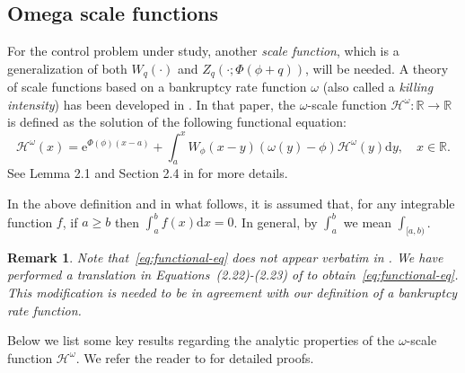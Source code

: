 \documentclass[11pt,reqno]{amsart}
\newcommand{\green}{\textcolor[rgb]{0.00,0.50,0.50}}
\newtheorem{remark}{Remark}[section]
\newcommand{\reals}{\mathbb{R}}
\newcommand{\diff}{\mathrm{d}}
\newcommand{\cH}{\mathcal{H}}
\renewcommand{\geq}{\geqslant}
\begin{document}
\subsection{Omega scale functions}\label{Sec:Solution:Complete}

For the control problem under study, another \textit{scale function}, which is a generalization of both $W_{q}(\cdot)$ and $Z_q (\cdot;\Phi(\phi+q))$, will be needed. A theory of scale functions based on a bankruptcy rate function $\omega$ (also called a \textit{killing intensity}) has been developed in \cite{li-palmowski_2018}. In that paper, the $\omega$-scale function $\cH^{\omega} \colon \reals \to \reals$ is defined as the solution of the following functional equation:
\begin{equation}\label{eq:functional-eq}
	\cH^{\omega}(x) = \mathrm e^{\Phi(\phi)(x-a)} + \int_{a}^x W_{\phi}(x-y) (\omega(y) - \phi) \cH^{\omega}(y) \diff y , \quad x \in \reals .
\end{equation}
See Lemma 2.1 and Section 2.4 in \cite{li-palmowski_2018} for more details.

In the above definition and in what follows, it is assumed that, for any integrable function $f$, if $a \geq b$ then $\int_a^b f(x) \diff x = 0$. In general, by $\int_a^b$ we mean $\int_{[a,b)}$.

\begin{remark}
	Note that~\eqref{eq:functional-eq} does not appear verbatim in \cite{li-palmowski_2018}. We have performed a translation in Equations~(2.22)-(2.23) of \cite{li-palmowski_2018} to obtain~\eqref{eq:functional-eq}. This modification is needed to be in agreement with our definition of a bankruptcy rate function.%
\end{remark}

Below we list some key results regarding the analytic properties of the $\omega$-scale function $\cH^{\omega}$. We refer the reader to \cite{mata-renaud_2024} for detailed proofs.
\end{document}
